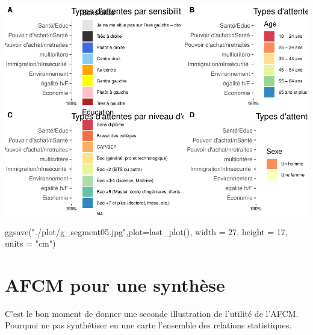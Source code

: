 \documentclass[
]{book}
\newenvironment{Shaded}{\begin{snugshade}}{\end{snugshade}}
\newcommand{\AttributeTok}[1]{\textcolor[rgb]{0.77,0.63,0.00}{#1}}
\newcommand{\DecValTok}[1]{\textcolor[rgb]{0.00,0.00,0.81}{#1}}
\newcommand{\FunctionTok}[1]{\textcolor[rgb]{0.00,0.00,0.00}{#1}}
\newcommand{\NormalTok}[1]{#1}
\newcommand{\StringTok}[1]{\textcolor[rgb]{0.31,0.60,0.02}{#1}}
\begin{document}
\includegraphics{bookdown-demo_files/figure-latex/0817-1.pdf}

\begin{Shaded}
\begin{Highlighting}[]
\FunctionTok{ggsave}\NormalTok{(}\StringTok{"./plot/g\_segment05.jpg"}\NormalTok{,}\AttributeTok{plot=}\FunctionTok{last\_plot}\NormalTok{(), }\AttributeTok{width =} \DecValTok{27}\NormalTok{, }\AttributeTok{height =} \DecValTok{17}\NormalTok{, }\AttributeTok{units =} \StringTok{"cm"}\NormalTok{)}
\end{Highlighting}
\end{Shaded}

\hypertarget{afcm-pour-une-synthuxe8se}{%
\section{AFCM pour une synthèse}\label{afcm-pour-une-synthuxe8se}}

C'est le bon moment de donner une seconde illustration de l'utilité de l'AFCM. Pourquoi ne pas synthétiser en une carte l'ensemble des relations statistiques.
\end{document}
